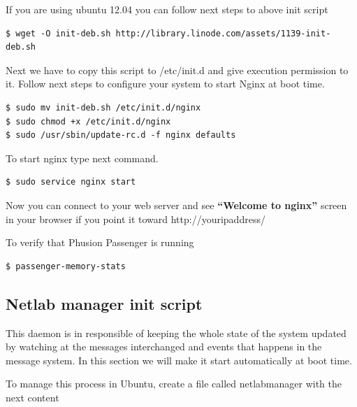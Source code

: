 \documentclass{article}
\begin{document}
If you are using ubuntu 12.04 you can follow next steps to above init script

\begin{verbatim}
$ wget -O init-deb.sh http://library.linode.com/assets/1139-init-deb.sh
\end{verbatim}

Next we have to copy this script to /etc/init.d and give execution permission to it. Follow next steps to configure your system to start Nginx at boot time.

\begin{verbatim}
$ sudo mv init-deb.sh /etc/init.d/nginx
$ sudo chmod +x /etc/init.d/nginx
$ sudo /usr/sbin/update-rc.d -f nginx defaults
\end{verbatim}

To start nginx type next command.

\begin{verbatim}
$ sudo service nginx start
\end{verbatim}

Now you can connect to your web server and see \textbf{“Welcome to nginx”} screen in your browser if you point it toward http://youripaddress/

To verify that Phusion Passenger is running
\begin{verbatim}
$ passenger-memory-stats
\end{verbatim}

\subsection{Netlab manager init script}
\label{sub:NetlabManagerBoot}
This daemon is in responsible of keeping the whole state of the system updated by watching at the messages interchanged and events that happens in the message system. In this section we will make it start automatically at boot time.

To manage this process in Ubuntu, create a file called netlabmanager with the next content
\end{document}
